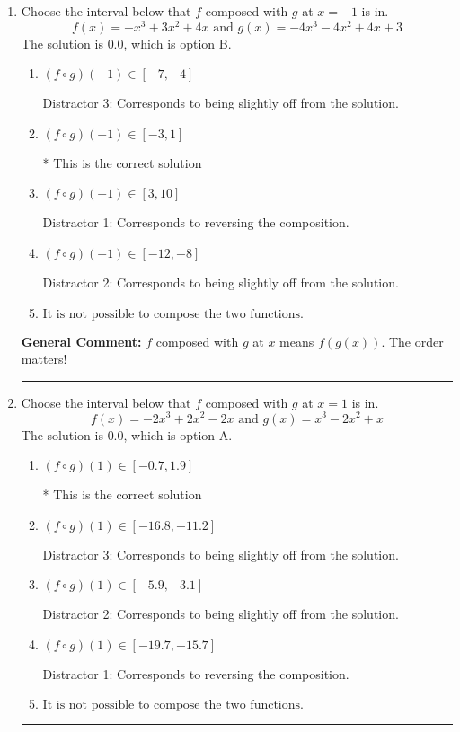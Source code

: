 \documentclass{extbook}[14pt]
\newcommand{\litem}[1]{\item #1

\rule{\textwidth}{0.4pt}}
\begin{document}
\begin{enumerate}\litem{
Choose the interval below that $f$ composed with $g$ at $x=-1$ is in.
\[ f(x) = -x^{3} +3 x^{2} +4 x \text{ and } g(x) = -4x^{3} -4 x^{2} +4 x + 3 \]The solution is \( 0.0 \), which is option B.\begin{enumerate}[label=\Alph*.]
\item \( (f \circ g)(-1) \in [-7, -4] \)

 Distractor 3: Corresponds to being slightly off from the solution.
\item \( (f \circ g)(-1) \in [-3, 1] \)

* This is the correct solution
\item \( (f \circ g)(-1) \in [3, 10] \)

 Distractor 1: Corresponds to reversing the composition.
\item \( (f \circ g)(-1) \in [-12, -8] \)

 Distractor 2: Corresponds to being slightly off from the solution.
\item \( \text{It is not possible to compose the two functions.} \)


\end{enumerate}

\textbf{General Comment:} $f$ composed with $g$ at $x$ means $f(g(x))$. The order matters!
}
\litem{
Choose the interval below that $f$ composed with $g$ at $x=1$ is in.
\[ f(x) = -2x^{3} +2 x^{2} -2 x \text{ and } g(x) = x^{3} -2 x^{2} +x \]The solution is \( 0.0 \), which is option A.\begin{enumerate}[label=\Alph*.]
\item \( (f \circ g)(1) \in [-0.7, 1.9] \)

* This is the correct solution
\item \( (f \circ g)(1) \in [-16.8, -11.2] \)

 Distractor 3: Corresponds to being slightly off from the solution.
\item \( (f \circ g)(1) \in [-5.9, -3.1] \)

 Distractor 2: Corresponds to being slightly off from the solution.
\item \( (f \circ g)(1) \in [-19.7, -15.7] \)

 Distractor 1: Corresponds to reversing the composition.
\item \( \text{It is not possible to compose the two functions.} \)


\end{enumerate}

}
\end{enumerate}
\end{document}

